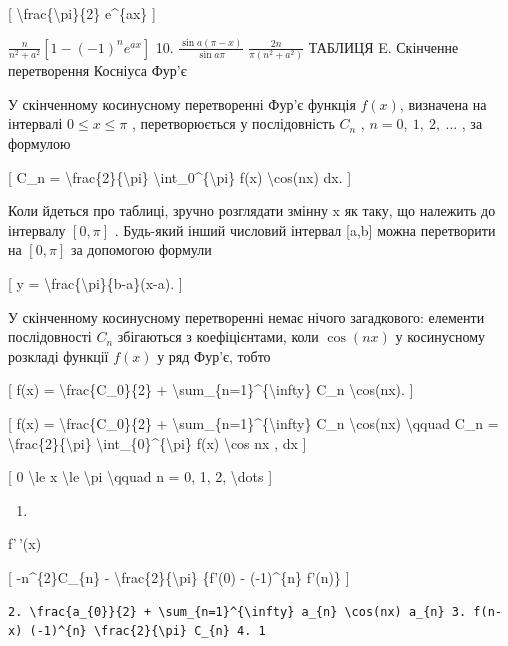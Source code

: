 \documentclass[
]{article}
\providecommand{\tightlist}{%
  \setlength{\itemsep}{0pt}\setlength{\parskip}{0pt}}
\begin{document}
{{[} \textbackslash frac\{\textbackslash pi\}\{2\} e\^{}\{ax\} {]}

\(\frac{n}{n^2 + a^2} [1 - (-1)^n e^{ax}]\) 10.
\(\frac{\sin a (\pi - x)}{\sin a\pi}\) \(\frac{2n}{\pi (n^2 + a^2)}\)
ТАБЛИЦЯ E. Скінченне перетворення Косніуса Фур'є

У скінченному косинусному перетворенні Фур'є функція \(f(x)\), визначена
на інтервалі \(0 \le x \le \pi\) , перетворюється у послідовність
\(C_n\) , \(n=0,\ 1,\ 2,\ \ldots\) , за формулою

{[} C\_n = \textbackslash frac\{2\}\{\textbackslash pi\}
\textbackslash int\_0\^{}\{\textbackslash pi\} f(x)
\textbackslash cos(nx) dx. {]}

Коли йдеться про таблиці, зручно розглядати змінну x як таку, що
належить до інтервалу \([0,\pi]\) . Будь-який інший числовий інтервал
{[}a,b{]} можна перетворити на \([0,\pi]\) за допомогою формули

{[} y = \textbackslash frac\{\textbackslash pi\}\{b-a\}(x-a). {]}

У скінченному косинусному перетворенні немає нічого загадкового:
елементи послідовності \(C_n\) збігаються з коефіцієнтами, коли
\(\cos{(nx)}\) у косинусному розкладі функції \(f(x)\) у ряд Фур'є,
тобто

{[} f(x) = \textbackslash frac\{C\_0\}\{2\} +
\textbackslash sum\_\{n=1\}\^{}\{\textbackslash infty\} C\_n
\textbackslash cos(nx). {]}

{[} f(x) = \textbackslash frac\{C\_0\}\{2\} +
\textbackslash sum\_\{n=1\}\^{}\{\textbackslash infty\} C\_n
\textbackslash cos(nx) \textbackslash qquad C\_n =
\textbackslash frac\{2\}\{\textbackslash pi\}
\textbackslash int\_\{0\}\^{}\{\textbackslash pi\} f(x)
\textbackslash cos nx , dx {]}

{[} 0 \textbackslash le x \textbackslash le \textbackslash pi
\textbackslash qquad n = 0, 1, 2, \textbackslash dots {]}

\begin{enumerate}
\def\labelenumi{\arabic{enumi}.}
\tightlist
\item
\end{enumerate}

f'\,'(x)

{[} -n\^{}\{2\}C\_\{n\} - \textbackslash frac\{2\}\{\textbackslash pi\}
\{f'(0) - (-1)\^{}\{n\} f'(n)\} {]}

\begin{verbatim}
2. \frac{a_{0}}{2} + \sum_{n=1}^{\infty} a_{n} \cos(nx) a_{n} 3. f(n-x) (-1)^{n} \frac{2}{\pi} C_{n} 4. 1
\end{verbatim}

}
\end{document}
